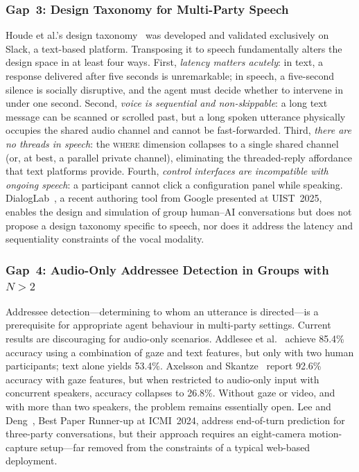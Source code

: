 \subsubsection{Gap~3: Design Taxonomy for Multi-Party Speech}
\label{sssec:gap3}

Houde et al.'s design taxonomy~\cite{houde2025koala} was developed and
validated exclusively on Slack, a text-based platform.  Transposing it to
speech fundamentally alters the design space in at least four ways.  First,
\emph{latency matters acutely}: in text, a response delivered after five
seconds is unremarkable; in speech, a five-second silence is socially
disruptive, and the agent must decide whether to intervene in under one second.
Second, \emph{voice is sequential and non-skippable}: a long text message can
be scanned or scrolled past, but a long spoken utterance physically occupies
the shared audio channel and cannot be fast-forwarded.  Third, \emph{there are
no threads in speech}: the \textsc{where} dimension collapses to a single
shared channel (or, at best, a parallel private channel), eliminating the
threaded-reply affordance that text platforms provide.  Fourth, \emph{control
interfaces are incompatible with ongoing speech}: a participant cannot click a
configuration panel while speaking.  DialogLab~\cite{hu2025dialoglab},
a recent authoring tool from Google presented at UIST~2025, enables the design
and simulation of group human--AI conversations but does not propose a design
taxonomy specific to speech, nor does it address the latency and sequentiality
constraints of the vocal modality.

\subsubsection{Gap~4: Audio-Only Addressee Detection in Groups with $N > 2$}
\label{sssec:gap4}

Addressee detection---determining to whom an utterance is directed---is a
prerequisite for appropriate agent behaviour in multi-party settings.  Current
results are discouraging for audio-only scenarios.  Addlesee et
al.~\cite{addlesee2024ari} achieve 85.4\% accuracy using a combination of gaze
and text features, but only with two human participants; text alone yields
53.4\%.  Axelsson and Skantze~\cite{axelsson2025furhat} report 92.6\% accuracy
with gaze features, but when restricted to audio-only input with concurrent
speakers, accuracy collapses to 26.8\%.  Without gaze or video, and with more
than two speakers, the problem remains essentially open.  Lee and
Deng~\cite{lee2024endofturn}, Best Paper Runner-up at ICMI~2024, address
end-of-turn prediction for three-party conversations, but their approach
requires an eight-camera motion-capture setup---far removed from the
constraints of a typical web-based deployment.

